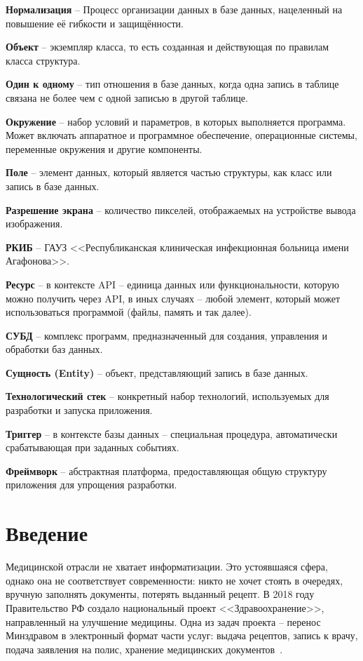 \documentclass[a4paper,article]{article}
\begin{document}
    \textbf{Нормализация} -- Процесс организации данных в базе данных, нацеленный на повышение её гибкости и защищённости.

    \textbf{Объект} -- экземпляр класса, то есть созданная и действующая по правилам класса структура.

    \textbf{Один к одному} -- тип отношения в базе данных, когда одна запись в таблице связана не более чем с одной записью в другой таблице.

    \textbf{Окружение} -- набор условий и параметров, в которых выполняется программа. Может включать аппаратное и программное обеспечение, операционные системы, переменные окружения и другие компоненты.

    \textbf{Поле} -- элемент данных, который является частью структуры, как класс или запись в базе данных.

    \textbf{Разрешение экрана} -- количество пикселей, отображаемых на устройстве вывода изображения.

    \textbf{РКИБ} -- ГАУЗ <<Республиканская клиническая инфекционная больница имени Агафонова>>.

    \textbf{Ресурс} -- в контексте API -- единица данных или функциональности, которую можно получить через API, в иных случаях -- любой элемент, который может использоваться программой (файлы, память и так далее).

    \textbf{СУБД} -- комплекс программ, предназначенный для создания, управления и обработки баз данных.

    \textbf{Сущность (Entity)} -- объект, представляющий запись в базе данных.

    \textbf{Технологический стек} -- конкретный набор технологий, используемых для разработки и запуска приложения.

    \textbf{Триггер} -- в контексте базы данных -- специальная процедура, автоматически срабатывающая при заданных событиях.

    \textbf{Фреймворк} -- абстрактная платформа, предоставляющая общую структуру приложения для упрощения разработки.

    \newpage

    \section*{Введение}

        Медицинской отрасли не хватает информатизации. Это устоявшаяся сфера, однако она не соответствует современности: никто не хочет стоять в очередях, вручную заполнять документы, потерять выданный рецепт. В 2018 году Правительство РФ создало национальный проект <<Здравоохранение>>, направленный на улучшение медицины. Одна из задач проекта -- перенос Минздравом в электронный формат части услуг: выдача рецептов, запись к врачу, подача заявления на полис, хранение медицинских документов~\cite{natsproektzdravoohranenie}.
\end{document}
